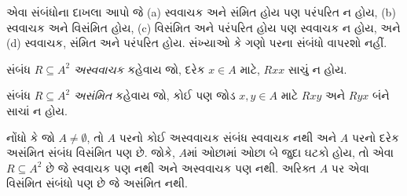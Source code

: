 \documentclass[../../../include/open-logic-section]{subfiles}
\begin{document}
\begin{prob}
એવા સંબંધોના દાખલા આપો જે (a) સ્વવાચક અને સંમિત હોય પણ
પરંપરિત ન હોય, (b) સ્વવાચક અને વિસંમિત હોય,
(c) વિસંમિત અને પરંપરિત હોય પણ સ્વવાચક ન હોય, અને
(d) સ્વવાચક, સંમિત અને પરંપરિત હોય.
સંખ્યાઓ કે ગણો પરના સંબંધો વાપરશો નહીં.
\end{prob}

\begin{defn}[અસ્વવાચકતા]
સંબંધ $R \subseteq A^2$ \emph{અસ્વવાચક} કહેવાય જો,
દરેક $x \in A$ માટે, $Rxx$ સાચું ન હોય.
\end{defn}

\begin{defn}[અસંમિતતા]
સંબંધ $R \subseteq A^2$ \emph{અસંમિત} કહેવાય જો,
કોઈ પણ જોડ $x,y\in A$ માટે $Rxy$ અને $Ryx$ બંને સાચાં ન હોય.
\end{defn}

નોંધો કે જો $A \neq \emptyset$, તો $A$ પરનો કોઈ અસ્વવાચક
સંબંધ સ્વવાચક નથી અને $A$ પરનો દરેક અસંમિત સંબંધ વિસંમિત
પણ છે. જોકે, $A$માં ઓછામાં ઓછા બે જુદા ઘટકો હોય, તો
એવા $R \subseteq A^2$ છે જે સ્વવાચક પણ નથી અને અસ્વવાચક પણ નથી.
અરિક્ત $A$ પર એવા વિસંમિત સંબંધો પણ છે જે અસંમિત નથી.
\end{document}
